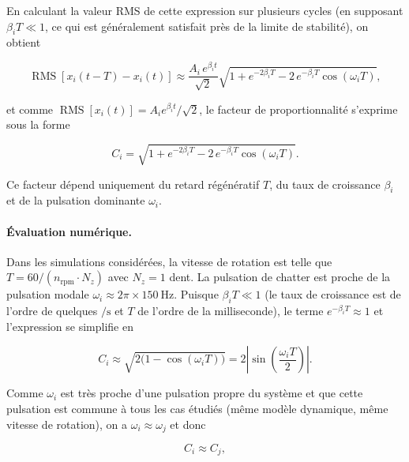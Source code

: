 \documentclass[
    11pt,
    a4paper
]{article}
\begin{document}
En calculant la valeur RMS de cette expression sur plusieurs cycles (en
supposant \(\beta_i T \ll 1\), ce qui est généralement satisfait près de la
limite de stabilité), on obtient

\begin{equation}
    \operatorname{RMS}\left[x_i(t-T)-x_i(t)\right]
    \approx
    \frac{A_i\,e^{\beta_i t}}{\sqrt{2}}
    \sqrt{1 + e^{-2\beta_i T} - 2\,e^{-\beta_i T}\cos(\omega_i T)},
\end{equation}

et comme \(\operatorname{RMS}[x_i(t)] = A_i e^{\beta_i t}/\sqrt{2}\), le
facteur de proportionnalité s'exprime sous la forme

\begin{equation}
    \boxed{
        C_i
        =
        \sqrt{1 + e^{-2\beta_i T} - 2\,e^{-\beta_i T}\cos(\omega_i T)}.
    }
    \label{eq:Ci-analytique}
\end{equation}

Ce facteur dépend uniquement du retard régénératif \(T\), du taux de croissance
\(\beta_i\) et de la pulsation dominante \(\omega_i\).

\paragraph{Évaluation numérique.}
Dans les simulations considérées, la vitesse de rotation est telle que
\(T = 60/(n_{\mathrm{rpm}}\cdot N_z)\) avec \(N_z=1\) dent. La pulsation de
chatter est proche de la pulsation modale \(\omega_i \approx 2\pi\times
\SI{150}{\hertz}\). Puisque \(\beta_i T \ll 1\) (le taux de croissance est de
l'ordre de quelques \(\si{\per\second}\) et \(T\) de l'ordre de la
milliseconde), le terme \(e^{-\beta_i T}\approx 1\) et l'expression se
simplifie en

\begin{equation}
    C_i
    \approx
    \sqrt{2\bigl(1 - \cos(\omega_i T)\bigr)}
    =
    2\left|\sin\!\left(\frac{\omega_i T}{2}\right)\right|.
    \label{eq:Ci-approx}
\end{equation}

Comme \(\omega_i\) est très proche d'une pulsation propre du système et que
cette pulsation est commune à tous les cas étudiés (même modèle dynamique,
même vitesse de rotation), on a \(\omega_i \approx \omega_j\) et donc

\begin{equation}
    C_i \approx C_j,
    \label{eq:Ci-Cj-approx}
\end{equation}
\end{document}
